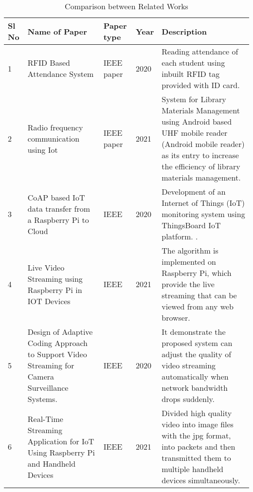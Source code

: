 \begin{table}
    	\centering
    	\caption{Comparison between Related Works}
    	\label{table }
    	\begin{tabular}{|p{.7cm}|p{3.5cm}|p{2.5cm}|p{1cm}|p{5.7cm}|}
    		\hline
    		           Sl No  & Name of Paper &	Paper type & Year & Description \\
    		
    		\hline
    		1&
    	RFID Based Attendance System & 
    		IEEE paper & 
    		2020 &
    Reading attendance of each student using inbuilt RFID tag provided with ID card.
\\
    		\hline
    		2 &
    		Radio frequency communication using Iot
    		
 &
    		IEEE paper &
    		2021&
    	System for Library Materials Management using Android based UHF mobile reader (Android mobile reader) as its entry to increase the efficiency of library materials management. \\
    		\hline
    		3&
   CoAP based IoT data transfer from a Raspberry Pi to Cloud &
    		IEEE
 &
    		2020&
    		Development of an Internet of Things (IoT) monitoring system using ThingsBoard IoT
    		platform.
    		.\\
    		\hline
    		4&
    	Live Video Streaming using Raspberry Pi in IOT Devices&	
    		IEEE
&

    		2021&The algorithm is implemented on Raspberry Pi, which provide the live streaming that can be viewed from any web browser.\\
            \hline
            5&
           Design of Adaptive Coding Approach to Support Video Streaming for Camera Surveillance Systems.&
IEEE
&
            2020&
           It demonstrate the proposed system can adjust the quality of video streaming automatically when network bandwidth drops suddenly.
             \\
            	\hline	
            6 &
           Real-Time Streaming Application for IoT Using Raspberry Pi and Handheld Devices &
            IEEE
 &
            2021 &
           Divided high quality video into image files with the jpg format, into packets and then transmitted them to multiple handheld devices simultaneously.
\\
\hline
 


           
    		\end{tabular}
    \end{table}
    \newpage
